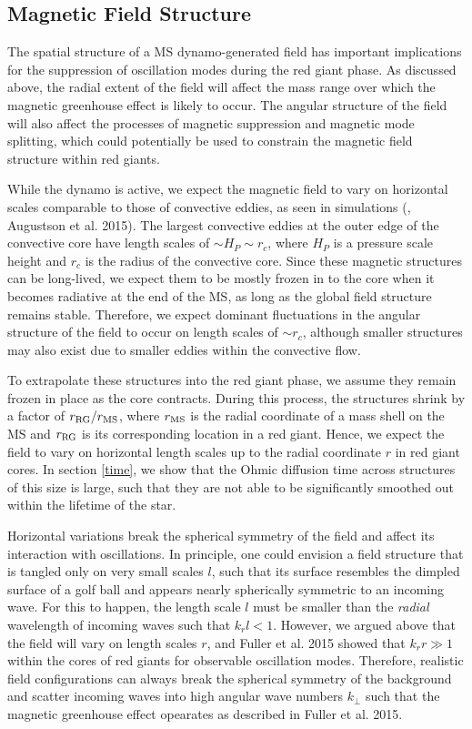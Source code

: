 \subsection{Magnetic Field Structure}
\label{fieldstruc}

The spatial structure of a MS dynamo-generated field has important implications for the suppression of oscillation modes during the red giant phase. As discussed above, the radial extent of the field will affect the mass range over which the magnetic greenhouse effect is likely to occur. The angular structure of the field will also affect the processes of magnetic suppression and magnetic mode splitting, which could potentially be used to constrain the magnetic field structure within red giants.

While the dynamo is active, we expect the magnetic field to vary on horizontal scales comparable to those of convective eddies, as seen in simulations (\citealt{Featherstone_2009}, Augustson et al. 2015). The largest convective eddies at the outer edge of the convective core have length scales of $\sim \! H_P \sim \! r_c$, where $H_P$ is a pressure scale height and $r_c$ is the radius of the convective core. Since these magnetic structures can be long-lived, we expect them to be mostly frozen in to the core when it becomes radiative at the end of the MS, as long as the global field structure remains stable. Therefore, we expect dominant fluctuations in the angular structure of the field to occur on length scales of $\sim \! r_c$, although smaller structures may also exist due to smaller eddies within the convective flow.

To extrapolate these structures into the red giant phase, we assume they remain frozen in place as the core contracts. During this process, the structures shrink by a factor of $r_{\rm RG}/r_{\rm MS}$, where $r_{\rm MS}$ is the radial coordinate of a mass shell on the MS and $r_{\rm RG}$ is its corresponding location in a red giant. Hence, we expect the field to vary on horizontal length scales up to the radial coordinate $r$ in red giant cores. In section \ref{time}, we show that the Ohmic diffusion time across structures of this size is large, such that they are not able to be significantly smoothed out within the lifetime of the star.

Horizontal variations break the spherical symmetry of the field and affect its interaction with oscillations. In principle, one could envision a field structure that is tangled only on very small scales $l$, such that its surface resembles the dimpled surface of a golf ball and appears nearly spherically symmetric to an incoming wave. For this to happen, the length scale $l$ must be smaller than the {\it radial} wavelength of incoming waves such that $k_r l < 1.$ However, we argued above that the field will vary on length scales $r$, and Fuller et al. 2015 showed that $k_r r \gg 1$ within the cores of red giants for observable oscillation modes. Therefore, realistic field configurations can always break the spherical symmetry of the background and scatter incoming waves into high angular wave numbers $k_\perp$ such that the magnetic greenhouse effect opearates as described in Fuller et al. 2015.